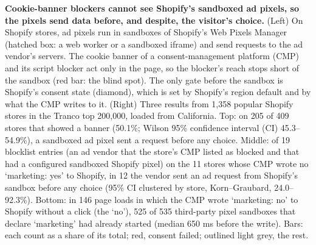 \textbf{Cookie-banner blockers cannot see Shopify's sandboxed ad pixels, so the pixels send data before, and despite, the visitor's choice.} (Left) On Shopify stores, ad pixels run in sandboxes of Shopify's Web Pixels Manager (hatched box: a web worker or a sandboxed iframe) and send requests to the ad vendor's servers. The cookie banner of a consent-management platform (CMP) and its script blocker act only in the page, so the blocker's reach stops short of the sandbox (red bar: the blind spot). The only gate before the sandbox is Shopify's consent state (diamond), which is set by Shopify's region default and by what the CMP writes to it. (Right) Three results from 1,358 popular Shopify stores in the Tranco top 200,000, loaded from California. Top: on 205 of 409 stores that showed a banner (50.1\%; Wilson 95\% confidence interval (CI) 45.3--54.9\%), a sandboxed ad pixel sent a request before any choice. Middle: of 19 blocklist entries (an ad vendor that the store's CMP listed as blocked and that had a configured sandboxed Shopify pixel) on the 11 stores whose CMP wrote no `marketing: yes' to Shopify, in 12 the vendor sent an ad request from Shopify's sandbox before any choice (95\% CI clustered by store, Korn--Graubard, 24.0--92.3\%). Bottom: in 146 page loads in which the CMP wrote `marketing: no' to Shopify without a click (the `no'), 525 of 535 third-party pixel sandboxes that declare `marketing' had already started (median 650 ms before the write). Bars: each count as a share of its total; red, consent failed; outlined light grey, the rest.

